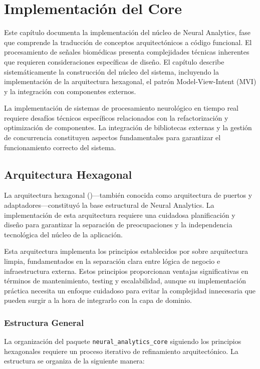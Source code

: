 \chapter{Implementación del Core}\label{ch:core_implementing}

Este capítulo documenta la implementación del núcleo de Neural Analytics, fase que comprende la traducción de conceptos arquitectónicos a código funcional. El procesamiento de señales biomédicas presenta complejidades técnicas inherentes que requieren consideraciones específicas de diseño. El capítulo describe sistemáticamente la construcción del núcleo del sistema, incluyendo la implementación de la arquitectura hexagonal, el patrón Model-View-Intent (MVI) y la integración con componentes externos.

La implementación de sistemas de procesamiento neurológico en tiempo real requiere desafíos técnicos específicos relacionados con la refactorización y optimización de componentes. La integración de bibliotecas externas y la gestión de concurrencia constituyen aspectos fundamentales para garantizar el funcionamiento correcto del sistema.

\section{Arquitectura Hexagonal}

La arquitectura hexagonal (\citeyear{martin2017clean})—también conocida como arquitectura de puertos y adaptadores—constituyó la base estructural de Neural Analytics. La implementación de esta arquitectura requiere una cuidadosa planificación y diseño para garantizar la separación de preocupaciones y la independencia tecnológica del núcleo de la aplicación.

Esta arquitectura implementa los principios establecidos por  sobre arquitectura limpia, fundamentados en la separación clara entre lógica de negocio e infraestructura externa. Estos principios proporcionan ventajas significativas en términos de mantenimiento, testing y escalabilidad, aunque su implementación práctica necesita un enfoque cuidadoso para evitar la complejidad innecesaria que pueden surgir a la hora de integrarlo con la capa de dominio.

\subsection{Estructura General}

La organización del paquete \texttt{neural\_analytics\_core} siguiendo los principios hexagonales requiere un proceso iterativo de refinamiento arquitectónico. La estructura se organiza de la siguiente manera:

